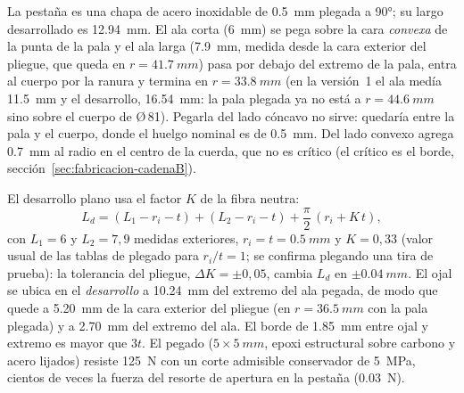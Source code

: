 La pestaña es una chapa de acero inoxidable de \SI{0.5}{mm} plegada a \ang{90}; su
largo desarrollado es \SI{12.94}{mm}. El ala corta (\SI{6}{mm}) se pega sobre la cara
\emph{convexa} de la punta de la pala y el ala larga (\SI{7.9}{mm}, medida desde la cara exterior del
pliegue, que queda en $r=\SI{41.7}{mm}$) pasa por debajo del extremo de la pala, entra al cuerpo por la
ranura y termina en $r=\SI{33.8}{mm}$ (en la versión~1 el ala medía \SI{11.5}{mm} y el desarrollo,
\SI{16.54}{mm}: la pala plegada ya no está a $r=\SI{44.6}{mm}$ sino sobre el cuerpo de Ø\,81). Pegarla
del lado cóncavo no sirve: quedaría entre la pala y el cuerpo, donde el huelgo nominal es de
\SI{0.5}{mm}. Del lado convexo agrega \SI{0.7}{mm} al radio en el centro de la cuerda, que
no es crítico (el crítico es el borde, sección~\ref{sec:fabricacion-cadenaB}).

El desarrollo plano usa el factor $K$ de la fibra neutra:
\begin{equation}
  L_d = (L_1 - r_i - t) + (L_2 - r_i - t) + \frac{\pi}{2}\,(r_i + K\,t),
  \label{eq:fabricacion-desarrollo}
\end{equation}
con $L_1=6$ y $L_2=7{,}9$ medidas exteriores, $r_i=t=\SI{0.5}{mm}$ y $K=0{,}33$ (valor
usual de las tablas de plegado para $r_i/t=1$; se confirma plegando una tira de prueba): la tolerancia del pliegue,
$\Delta K=\pm0{,}05$, cambia $L_d$ en $\pm\SI{0.04}{mm}$. El ojal se ubica en el
\emph{desarrollo} a \SI{10.24}{mm} del extremo del ala pegada, de modo que quede a
\SI{5.20}{mm} de la cara exterior del pliegue (en $r=\SI{36.5}{mm}$ con la pala plegada) y a \SI{2.70}{mm}
del extremo del ala.
El borde de \SI{1.85}{mm} entre ojal y extremo es mayor que $3t$. El pegado
($5\times\SI{5}{mm}$, epoxi estructural sobre carbono y acero lijados) resiste
\SI{125}{N} con un corte admisible conservador de \SI{5}{MPa}, cientos de veces la fuerza
del resorte de apertura en la pestaña (\SI{0.03}{N}).

